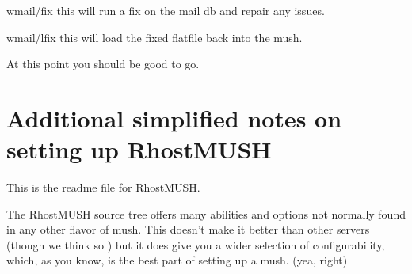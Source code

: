 \documentclass[letterpaper,10pt,english]{sphinxmanual}
\begin{document}
\sphinxAtStartPar
wmail/fix   \textendash{} this will run a fix on the mail db and repair any issues.

\sphinxAtStartPar
wmail/lfix  \textendash{} this will load the fixed flatfile back into the mush.

\sphinxAtStartPar
At this point you should be good to go.


\chapter{Additional simplified notes on setting up RhostMUSH}
\label{\detokenize{29-setup:additional-simplified-notes-on-setting-up-rhostmush}}\label{\detokenize{29-setup::doc}}
\sphinxAtStartPar
This is the readme file for RhostMUSH.

\sphinxAtStartPar
The RhostMUSH source tree offers many abilities and options
not normally found in any other flavor of mush.  This doesn’t
make it better than other servers (though we think so )
but it does give you a wider selection of configurability,
which, as you know, is the best part of setting up a mush.
(yea, right)
\end{document}
